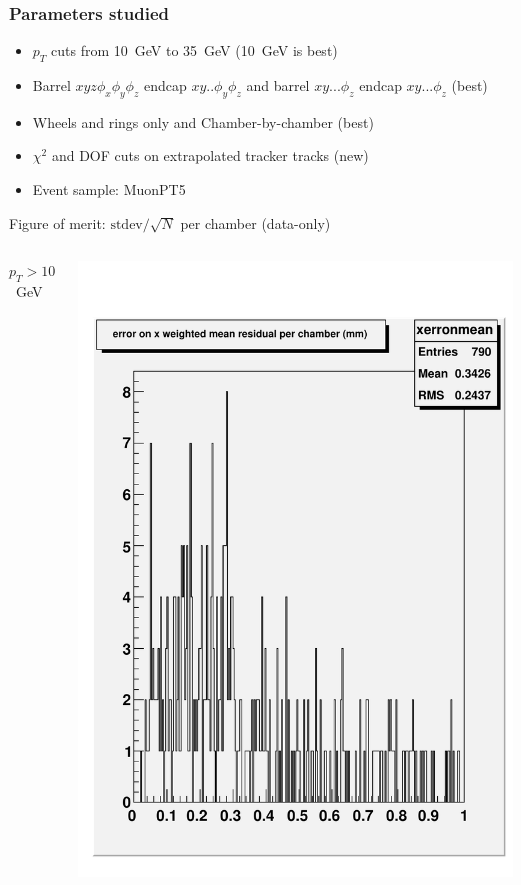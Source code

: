 \documentclass[compress]{beamer}
\begin{document}
\begin{frame}
\frametitle{Parameters studied}

\begin{itemize}
\item $p_T$ cuts from 10~GeV to 35~GeV (10~GeV is best)
\item Barrel $xyz\phi_x\phi_y\phi_z$ endcap $xy..\phi_y\phi_z$ and barrel $xy...\phi_z$ endcap $xy...\phi_z$ (best)
\item Wheels and rings only and Chamber-by-chamber (best)
\item $\chi^2$ and DOF cuts on extrapolated tracker tracks (new)
\item Event sample: MuonPT5
\end{itemize}

\vfill
Figure of merit: $\mbox{stdev}/\sqrt{N}$ per chamber (data-only)

\begin{center}
\begin{columns}
$p_T > 10$~GeV

\includegraphics[width=\linewidth]{xerronmeanPT10.pdf}


\end{columns}
\end{center}
\end{frame}
\end{document}
